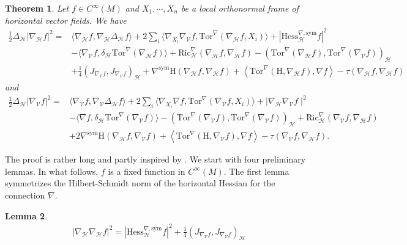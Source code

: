 \documentclass[11pt]{article}
\numberwithin{equation}{section}
\newtheorem{theorem}{Theorem}[section]
\newtheorem{lemma}[theorem]{Lemma}
\newcommand{\Ho}{\mathcal H}
\newcommand{\V}{\mathcal V}
\begin{document}
	\begin{theorem}\label{Bochner}
		Let $f \in C^\infty (M)$ and  $X_1,\cdots,X_n$ be a local orthonormal frame of horizontal vector fields. We have
		\begin{align*}
			\frac{1}{2}\Delta_{\mathcal{H}} | \nabla_\Ho f|^2=&\langle \nabla_{\mathcal{H}} f , \nabla_{\mathcal{H}}\Delta_{\mathcal{H}} f \rangle+2\sum_i\langle \nabla_{X_i} \nabla_\V f, \mathrm{Tor}^\nabla(\nabla_{\mathcal{H}}f, X_i) \rangle+| \mathrm{Hess}_\Ho^{\nabla, \mathrm{sym}} f|^2\\
			&- \langle \nabla_\V f, \delta_\Ho \mathrm{Tor}^\nabla ( \nabla_\Ho f ) \rangle+\mathrm{Ric}_\Ho^\nabla(\nabla_{\mathcal{H}} f, \nabla_{\mathcal{H}} f )-(\mathrm{Tor}^\nabla (\nabla_\Ho f),\mathrm{Tor}^\nabla (\nabla_\V f) )_\Ho\\
			&+\frac{1}{4}( J_{\nabla_\V f} , J_{\nabla_\V f} )_\Ho+ \nabla^{\mathrm{sym}} \mathrm H(\nabla_\Ho f,\nabla_\Ho f)+\left\langle \mathrm{Tor}^\nabla (\mathrm H, \nabla_\Ho f), \nabla f \right\rangle -\tau(\nabla_\Ho f,\nabla_\Ho f)
		\end{align*}
		and
		\begin{align*}
			\frac{1}{2}\Delta_{\mathcal{H}} | \nabla_\V f|^2=&\langle \nabla_{\mathcal{V}} f , \nabla_{\mathcal{V}}\Delta_{\mathcal{H}} f \rangle+2\sum_i\langle \nabla_{X_i} \nabla f, \mathrm{Tor}^\nabla(\nabla_{\mathcal{V}}f, X_i) \rangle+\mid \nabla_{\mathcal{H}} \nabla_{\mathcal{V}} f \mid^2\\ 
			&-\langle \nabla f, \delta_\Ho \mathrm{Tor}^\nabla ( \nabla_\V f ) \rangle-(\mathrm{Tor}^\nabla (\nabla_\V f),\mathrm{Tor}^\nabla (\nabla_\V f) )_\Ho +\mathrm{Ric}^\nabla_\Ho(\nabla_\V f,\nabla_\Ho f)\\
            &+2\nabla^{\mathrm{sym}}\mathrm H(\nabla_\Ho f,\nabla_\V f)+\left\langle \mathrm{Tor}^\nabla (\mathrm H, \nabla_\V f), \nabla f \right\rangle-\tau(\nabla_\V f,\nabla_\Ho f).
		\end{align*}
	\end{theorem}
	
	The proof is rather long and partly inspired by \cite{Hladky}. We start  with four preliminary lemmas. In what follows, $f$ is a fixed function in $C^\infty(M)$. The first lemma symmetrizes the Hilbert-Schmidt norm of the horizontal Hessian for the connection $\nabla$.

	
	\begin{lemma}\label{symmetrized-hessian}
		\begin{align*}
			|\nabla_\Ho \nabla_\Ho f|^2 =| \mathrm{Hess}_\Ho^{\nabla, \mathrm{sym}} f|^2 +\frac{1}{4}( J_{\nabla_\V f} , J_{\nabla_\V f} )_\Ho
		\end{align*}
	\end{lemma}
	
\end{document}
